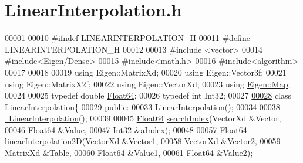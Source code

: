 \hypertarget{_linear_interpolation_8h_source}{}\section{Linear\+Interpolation.\+h}
\label{_linear_interpolation_8h_source}

\begin{DoxyCode}
00001 
00010 \textcolor{preprocessor}{#ifndef LINEARINTERPOLATION\_H}
00011 \textcolor{preprocessor}{#define LINEARINTERPOLATION\_H}
00012 
00013 \textcolor{preprocessor}{#include <vector>}
00014 \textcolor{preprocessor}{#include<Eigen/Dense>}
00015 \textcolor{preprocessor}{#include<math.h>}
00016 \textcolor{preprocessor}{#include<algorithm>}
00017 
00018 
00019 \textcolor{keyword}{using} Eigen::MatrixXd;
00020 \textcolor{keyword}{using} Eigen::Vector3f;
00021 \textcolor{keyword}{using} Eigen::MatrixX2f;
00022 \textcolor{keyword}{using} Eigen::VectorXd;
00023 \textcolor{keyword}{using} \hyperlink{group___core___module_class_eigen_1_1_map}{Eigen::Map};
00024 
00025 \textcolor{keyword}{typedef} \textcolor{keywordtype}{double} \hyperlink{group___tools_ga3f1431cb9f76da10f59246d1d743dc2c}{Float64};
00026 \textcolor{keyword}{typedef} \textcolor{keywordtype}{int}    Int32;
00027 
\hyperlink{class_linear_interpolation}{00028} \textcolor{keyword}{class }\hyperlink{class_linear_interpolation}{LinearInterpolation}\{
00029 \textcolor{keyword}{public}:
00033     \hyperlink{class_linear_interpolation_aaae2ec77e7767bb5fc7ca34a6e1197f1}{LinearInterpolation}();
00034 
00038     \hyperlink{class_linear_interpolation_a36a34fa39c430e05bdc073c1ac9ad4df}{~LinearInterpolation}();
00039 
00045     \hyperlink{group___tools_ga3f1431cb9f76da10f59246d1d743dc2c}{Float64} \hyperlink{class_linear_interpolation_aa9faf7177964de6d3b68a69cdbf7ef1a}{searchIndex}(VectorXd &Vector,
00046                         \hyperlink{group___tools_ga3f1431cb9f76da10f59246d1d743dc2c}{Float64} &Value,
00047                         Int32 &aIndex);
00048 
00057     \hyperlink{group___tools_ga3f1431cb9f76da10f59246d1d743dc2c}{Float64} \hyperlink{class_linear_interpolation_aaf48c1f0fa673ada9b8d6218690161f4}{linearInterpolation2D}(VectorXd &Vector1,
00058                                   VectorXd &Vector2,
00059                                   MatrixXd &Table,
00060                                   \hyperlink{group___tools_ga3f1431cb9f76da10f59246d1d743dc2c}{Float64} &Value1,
00061                                   \hyperlink{group___tools_ga3f1431cb9f76da10f59246d1d743dc2c}{Float64} &Value2);

\end{DoxyCode}
